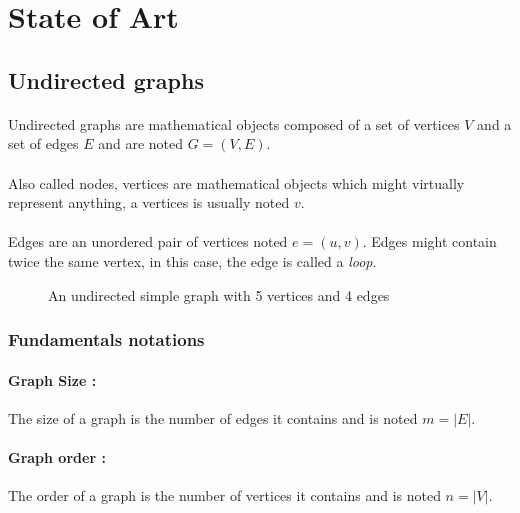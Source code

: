 \section{State of Art}

\subsection{Undirected graphs}

\paragraph{}
Undirected graphs are mathematical objects composed of a set of vertices $V$
and a set of edges $E$ and are noted $G = (V,E)$.

\paragraph{}
Also called nodes, vertices are mathematical objects which might virtually
represent anything, a vertices is usually noted $v$.

\paragraph{}
Edges are an unordered pair of vertices noted $e = (u,v)$. Edges might
contain twice the same vertex, in this case, the edge is called a {\em loop}.

\begin{figure}[!h]
  \begin{center}
    
  \end{center}
  \caption{An undirected simple graph with 5 vertices and 4 edges}
\end{figure}

\subsubsection{Fundamentals notations}

\paragraph{Graph Size :}
The size of a graph is the number of edges it contains and is noted
$m = |E|$.

\paragraph{Graph order :}
The order of a graph is the number of vertices it contains and is noted
$n = |V|$.

